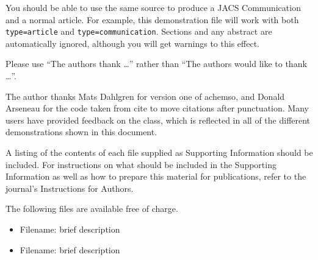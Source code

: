 \documentclass[journal=jacsat,manuscript=article]{achemso}
\begin{document}
You should be able to use the same source to produce a JACS
Communication and a normal article.  For example, this demonstration
file will work with both \texttt{type=article} and
\texttt{type=communication}. Sections and any abstract are
automatically ignored, although you will get warnings to this effect.

\begin{acknowledgement}

Please use ``The authors thank \ldots'' rather than ``The
authors would like to thank \ldots''.

The author thanks Mats Dahlgren for version one of \textsf{achemso},
and Donald Arseneau for the code taken from \textsf{cite} to move
citations after punctuation. Many users have provided feedback on the
class, which is reflected in all of the different demonstrations
shown in this document.

\end{acknowledgement}

\begin{suppinfo}

A listing of the contents of each file supplied as Supporting Information
should be included. For instructions on what should be included in the
Supporting Information as well as how to prepare this material for
publications, refer to the journal's Instructions for Authors.

The following files are available free of charge.
\begin{itemize}
  \item Filename: brief description
  \item Filename: brief description
\end{itemize}

\end{suppinfo}
\end{document}
